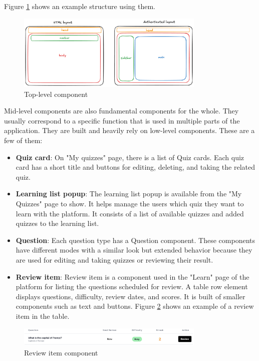 Figure \ref{fig:top-level-components} shows an example structure using them.

\begin{figure}[H]
    \centering
    \includegraphics[width=0.8\textwidth, keepaspectratio]{figures/top-level-components.png}
    \caption{Top-level component}
    \label{fig:top-level-components}
\end{figure}

Mid-level components are also fundamental components for the whole. They usually correspond to a specific function that is used in multiple parts of the application. They are built and heavily rely on low-level components. These are a few of them: 

\begin{itemize}
\item \textbf{Quiz card}: On "My quizzes" page, there is a list of Quiz cards. Each quiz card has a short title and buttons for editing, deleting, and taking the related quiz.
\item \textbf{Learning list popup}: The learning list popup is available from the "My Quizzes" page to show. It helps manage the users which quiz they want to learn with the platform. It consists of a list of available quizzes and added quizzes to the learning list.
\item \textbf{Question}: Each question type has a Question component. These components have different modes with a similar look but extended behavior because they are used for editing and taking quizzes or reviewing their result.
\item \textbf{Review item}: Review item is a component used in the "Learn" page of the platform for listing the questions scheduled for review. A table row element displays questions, difficulty, review dates, and scores. It is built of smaller components such as text and buttons. Figure \ref{fig:review-item-component} shows an example of a review item in the table.
\end{itemize}

\begin{figure}[H]
    \centering
    \includegraphics[width=0.8\textwidth, keepaspectratio]{figures/review-item-component.png}
    \caption{Review item component}
    \label{fig:review-item-component}
\end{figure}


